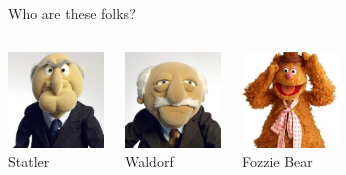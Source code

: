 \documentclass{beamer}\usepackage[]{graphicx}\usepackage[]{color}
\begin{document}
\begin{darkframes}
\begin{frame}{Who are these folks?}
\begin{columns}[onlytextwidth]
\begin{center}
        \includegraphics[width=1in]{statler} \\
        Statler
      \end{center}
      \begin{center}
        \includegraphics[width=1in]{waldorf} \\
        Waldorf
      \end{center}
      \begin{center}
        \includegraphics[width=1in]{fozziebear} \\
        Fozzie Bear
      \end{center}
  \end{columns}
\end{frame}


\end{darkframes}
\end{document}
